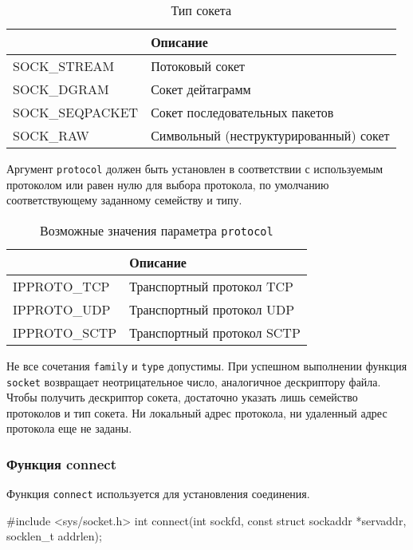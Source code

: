 \begin{table}[h!]
  \caption{Тип сокета}
  \begin{center}
    \begin{tabular}{p{3.5cm}l}
      \toprule
      & \textbf{Описание} \\
      \midrule
      SOCK\_STREAM & Потоковый сокет \\
      SOCK\_DGRAM & Сокет дейтаграмм \\
      SOCK\_SEQPACKET & Сокет последовательных пакетов \\
      SOCK\_RAW & Символьный (неструктурированный) сокет \\
      \bottomrule
    \end{tabular}
  \end{center}
\end{table}

 Аргумент \lstinline{protocol} должен быть установлен в соответствии с используемым протоколом или равен нулю для выбора протокола, по умолчанию соответствующему заданному семейству и типу.
\begin{table}[h!]
  \caption{Возможные значения параметра \lstinline{protocol}}
  \begin{center}
    \begin{tabular}{p{3cm}l}
      \toprule
      & \textbf{Описание} \\
      \midrule
      IPPROTO\_TCP & Транспортный протокол TCP \\
      IPPROTO\_UDP & Транспортный протокол UDP \\
      IPPROTO\_SCTP & Транспортный протокол SCTP \\
      \bottomrule
    \end{tabular}
  \end{center}
\end{table}

Не все сочетания \lstinline{family} и \lstinline{type} допустимы. При успешном выполнении функция \lstinline{socket} возвращает неотрицательное число, аналогичное дескриптору файла. Чтобы получить дескриптор сокета, достаточно указать лишь семейство протоколов и тип сокета. Ни локальный адрес протокола, ни удаленный адрес протокола еще не заданы.

\subsubsection{Функция connect}
Функция \lstinline{connect} используется для установления соединения.
\begin{clst}{}{}
#include <sys/socket.h>
int connect(int sockfd, const struct sockaddr *servaddr, socklen_t addrlen);
\end{clst}

